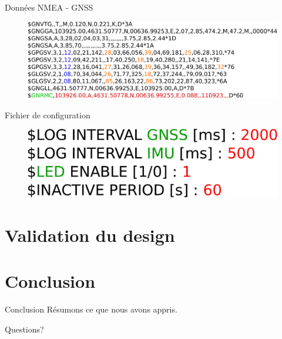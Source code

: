 \documentclass{beamer}
\begin{document}
\begin{frame}{Données NMEA - GNSS}	
	\begin{figure}[h]
		\centering
		\includegraphics[width=0.9\linewidth]{../figures/presentation/donnees-NMEA}
	\end{figure}
	\begin{figure}[h]
		\centering
	\end{figure}
\end{frame}

\begin{frame}{Fichier de configuration}
	\begin{figure}[h]
		\centering
		\includegraphics[width=0.7\linewidth]{../figures/presentation/config}
	\end{figure}
\end{frame}


\section{Validation du design}

\section{Conclusion}
\begin{frame}{Conclusion}
	Résumons ce que nous avons appris.
\end{frame}

\begin{frame}[standout]
	Questions?
\end{frame}
	
\end{document}
